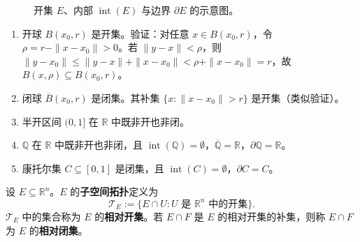 \begin{figure}[htbp]
\centering
{}
\caption{开集 $E$、内部 $\operatorname{int}(E)$ 与边界 $\partial E$ 的示意图。}
\label{fig:open_set_interior_boundary}
\end{figure}

\begin{example}[开集与闭集的实例]\label{ex:open_closed_examples}
\begin{enumerate}[label=(\roman*)]
    \item 开球 $B(x_0, r)$ 是开集。验证：对任意 $x \in B(x_0, r)$，令 $\rho = r - \|x - x_0\| > 0$。若 $\|y - x\| < \rho$，则 $\|y - x_0\| \le \|y - x\| + \|x - x_0\| < \rho + \|x - x_0\| = r$，故 $B(x, \rho) \subseteq B(x_0, r)$。
    \item 闭球 $\overline{B}(x_0, r)$ 是闭集。其补集 $\{x : \|x - x_0\| > r\}$ 是开集（类似验证）。
    \item 半开区间 $(0, 1]$ 在 $\mathbb{R}$ 中既非开也非闭。
    \item $\mathbb{Q}$ 在 $\mathbb{R}$ 中既非开也非闭，且 $\operatorname{int}(\mathbb{Q}) = \emptyset$，$\overline{\mathbb{Q}} = \mathbb{R}$，$\partial \mathbb{Q} = \mathbb{R}$。
    \item 康托尔集 $C \subseteq [0,1]$ 是闭集，且 $\operatorname{int}(C) = \emptyset$，$\partial C = C$。
\end{enumerate}
\end{example}

\begin{definition}[子空间拓扑]\label{def:subspace_topology}
设 $E \subseteq \mathbb{R}^n$。$E$ 的\textbf{子空间拓扑}定义为
\[
\mathcal{T}_E := \{E \cap U : U \text{ 是 } \mathbb{R}^n \text{ 中的开集}\}.
\]
$\mathcal{T}_E$ 中的集合称为 $E$ 的\textbf{相对开集}。若 $E \cap F$ 是 $E$ 的相对开集的补集，则称 $E \cap F$ 为 $E$ 的\textbf{相对闭集}。
\end{definition}

